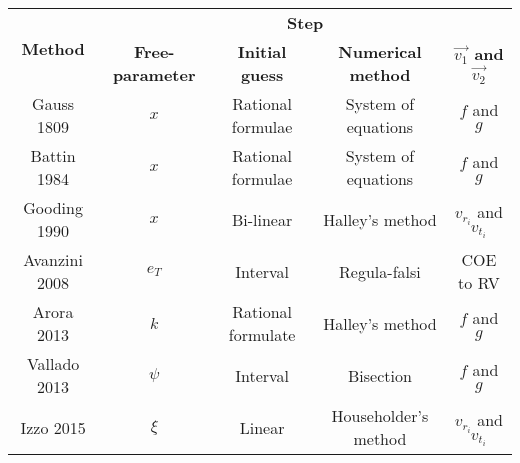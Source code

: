 \begin{table}[H]
  \footnotesize
  \centering
  \begin{tabular}{|c|c|c|c|c|}
    \hline
    \multirow{2}{*}{\textbf{Method}} & \multicolumn{4}{c|}{\textbf{Step}}                                                                                             \\ \cline{2-5}
                                     & \textbf{Free-parameter}            & \textbf{Initial guess} & \textbf{Numerical method} & \textbf{$\vec{v_1}$ and $\vec{v_2}$} \\ \hline
    Gauss 1809                       & $x$                                & Rational formulae      & System of equations       & $f$ and $g$                          \\ \hline
    Battin 1984                      & $x$                                & Rational formulae      & System of equations       & $f$ and $g$                          \\ \hline
    Gooding 1990                     & $x$                                & Bi-linear              & Halley's method           & $v_{r_i}$ and $v_{t_i}$              \\ \hline
    Avanzini 2008                    & $e_T$                              & Interval               & Regula-falsi              & COE to RV                            \\ \hline
    Arora 2013                       & $k$                                & Rational formulate     & Halley's method           & $f$ and $g$                          \\ \hline
    Vallado 2013                     & $\psi$                             & Interval               & Bisection                 & $f$ and $g$                          \\ \hline
    Izzo 2015                        & $\xi$                              & Linear                 & Householder's method      & $v_{r_i}$ and $v_{t_i}$              \\ \hline
  \end{tabular}
\end{table}
